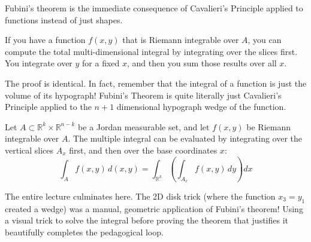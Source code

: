 \begin{spoken_clean}
Fubini's theorem is the immediate consequence of Cavalieri's Principle applied to functions instead of just shapes. 

If you have a function $f(x,y)$ that is Riemann integrable over $A$, you can compute the total multi-dimensional integral by integrating over the slices first. You integrate over $y$ for a fixed $x$, and then you sum those results over all $x$. 

The proof is identical. In fact, remember that the integral of a function is just the volume of its hypograph! Fubini's Theorem is quite literally just Cavalieri's Principle applied to the $n+1$ dimensional hypograph wedge of the function.
\end{spoken_clean}

\begin{orangeformula}
\begin{theorem}
Let $A \subset \mathbb{R}^k \times \mathbb{R}^{n-k}$ be a Jordan measurable set, and let $f(x,y)$ be Riemann integrable over $A$. The multiple integral can be evaluated by integrating over the vertical slices $A_x$ first, and then over the base coordinates $x$:
\[
\int_A f(x,y) \, d(x,y) = \int_{\mathbb{R}^k} \left( \int_{A_x} f(x,y) \, dy \right) dx
\]
\end{theorem}
\end{orangeformula}

\begin{didactic_insight}
The entire lecture culminates here. The 2D disk trick (where the function $x_3 = y_1$ created a wedge) was a manual, geometric application of Fubini's theorem! Using a visual trick to solve the integral before proving the theorem that justifies it beautifully completes the pedagogical loop.
\end{didactic_insight}
